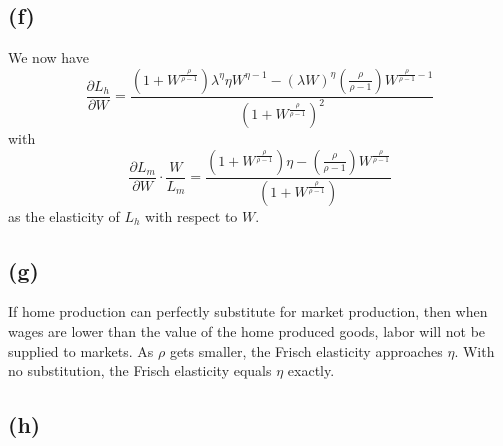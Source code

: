 \documentclass[11pt]{amsart}
\begin{document}
\subsection*{(f)}

We now have
\[
\frac{\partial L_h}{\partial W} = \frac{(1 + W^{\frac{\rho}{\rho-1}}) \lambda^{\eta} \eta W^{\eta - 1} - (\lambda W)^{\eta} (\frac{\rho}{\rho-1}) W^{\frac{\rho}{\rho-1} - 1}}{(1 + W^{\frac{\rho}{\rho-1}})^2}
\]
with 
\[
\frac{\partial L_m}{\partial W} \cdot \frac{W}{L_m} = \frac{(1 + W^{\frac{\rho}{\rho-1}}) \eta  -  (\frac{\rho}{\rho-1}) W^{\frac{\rho}{\rho-1}}}{(1 + W^{\frac{\rho}{\rho-1}})}
\]
as the elasticity of $L_h$ with respect to $W$.

\subsection*{(g)}

If home production can perfectly substitute for market production, then when wages are lower than the value of the home produced goods, labor will not be supplied to markets. 
As $\rho$ gets smaller, the Frisch elasticity approaches $\eta$. 
With no substitution, the Frisch elasticity equals $\eta$ exactly. 
	


\subsection*{(h)}
\end{document}
